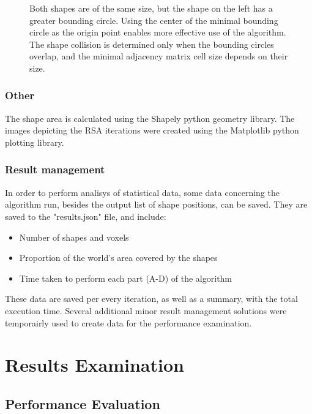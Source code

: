 \documentclass[12pt, oneside]{report}
\begin{document}
\begin{figure}
\caption{Both shapes are of the same size, but the shape on the left has a greater bounding circle. Using the center of the minimal bounding circle as the origin point enables more effective use of the algorithm. The shape collision is determined only when the bounding circles overlap, and the minimal adjacency matrix cell size depends on their size.}
\end{figure}

\subsection{Other}

The shape area is calculated using the Shapely python geometry library\cite{shapely}. \newline
The images depicting the RSA iterations were created using the Matplotlib python plotting library\cite{matplotlib}.

\subsection{Result management}

In order to perform analisys of statistical data, some data concerning the algorithm run, besides the output list of shape positions, can be saved. They are saved to the "results.json" file, and include:
\begin{itemize}
  \item Number of shapes and voxels
 	\item Proportion of the world's area covered by the shapes
	\item Time taken to perform each part (A-D) of the algorithm
\end{itemize}
These data are saved per every iteration, as well as a summary, with the total execution time. \newline
Several additional minor result management solutions were temporairly used to create data for the performance examination.



\chapter{Results Examination}
\section{Performance Evaluation}
\end{document}
